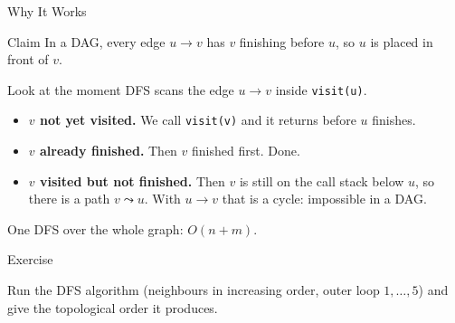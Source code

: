 \documentclass[10pt,aspectratio=169]{beamer}
\begin{document}
\begin{frame}{Why It Works}
  \begin{block}{Claim}
    In a DAG, every edge $u \to v$ has $v$ finishing \alert{before} $u$, so
    $u$ is placed in front of $v$.
  \end{block}

  \bigskip
  Look at the moment DFS scans the edge $u \to v$ inside \texttt{visit(u)}.
  \begin{itemize}
    \item \textbf{$v$ not yet visited.} We call \texttt{visit(v)} and it
          returns before $u$ finishes.
    \pause
    \item \textbf{$v$ already finished.} Then $v$ finished first. Done.
    \pause
    \item \textbf{$v$ visited but not finished.} Then $v$ is still on the
          call stack below $u$, so there is a path $v \leadsto u$. With
          $u \to v$ that is a \alert{cycle}: impossible in a DAG.
  \end{itemize}

  \pause
  \bigskip
  \begin{center}
    One DFS over the whole graph: $O(n + m)$.
  \end{center}
\end{frame}

\begin{frame}{Exercise}
  \begin{center}
    Run the DFS algorithm (neighbours in increasing order, outer loop
    $1, \ldots, 5$) and give the topological order it produces.
  \end{center}

  \bigskip
  \begin{center}
  \end{center}
\end{frame}
\end{document}
